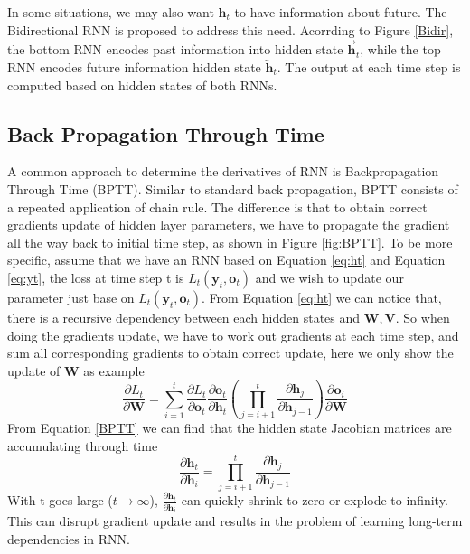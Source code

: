 	\noindent
	    In some situations, we may also want $\mathbf{h}_{t}$ to have information about future. 
	    The Bidirectional RNN\cite{schuster1997bidirectional} is proposed to address this need.
	    Acorrding to Figure \ref{Bidir}, the bottom RNN encodes past information into hidden state $\overrightarrow{\mathbf{h}}_{t}$, while the top RNN encodes future information hidden state $\overleftarrow{\mathbf{h}}_{t}$.
	The output at each time step is computed based on hidden states of both RNNs.  
\subsection{Back Propagation Through Time}
A common approach to determine the derivatives of RNN is Backpropagation Through Time (BPTT)\cite{werbos1990backpropagation}. 
Similar to standard back propagation, BPTT consists of a repeated application of chain rule. 
The difference is that to obtain correct gradients update of hidden layer parameters, we have to propagate the gradient all the way back to initial time step, as shown in Figure \ref{fig:BPTT}. 
	To be more specific, assume that we have an RNN based on Equation \ref{eq:ht} and Equation \ref{eq:yt}, the loss at time step t is $L_{t}(\mathbf{y}_{t},\mathbf{o}_{t})$ and we wish to update our parameter just base on $L_{t}(\mathbf{y}_{t},\mathbf{o}_{t})$.
	From Equation \ref{eq:ht} we can notice that, there is a recursive dependency between each hidden states and $\mathbf{W},\mathbf{V}$.
	So when doing the gradients update, we have to work out gradients at each time step, and sum all corresponding gradients to obtain correct update, here we only show the update of $\mathbf{W}$ as example
	\begin{equation}\label{BPTT}
	\frac{\partial L_{t}}{\partial \mathbf{W}} = \sum_{i=1}^{t}\frac{\partial L_{t}}{\partial\mathbf{o}_{t}}\frac{\partial \mathbf{o}_{t}}{\partial \mathbf{h}_{t}}(\prod_{j=i+1}^{t}\frac{\partial \mathbf{h}_{j}}{\partial \mathbf{h}_{j-1}})\frac{\partial \mathbf{o}_{i}}{\partial \mathbf{W}}
	\end{equation}
	From Equation \ref{BPTT} we can find that the hidden state Jacobian matrices are accumulating through time
	\[\frac{\partial \mathbf{h}_{t}}{\partial \mathbf{h}_{i}} = \prod_{j=i+1}^{t}\frac{\partial \mathbf{h}_{j}}{\partial \mathbf{h}_{j-1}}\]
	With t goes large ($t \rightarrow \infty$), $\frac{\partial \mathbf{h}_{t}}{\partial \mathbf{h}_{i}}$ can quickly shrink to zero or explode to infinity\cite{pascanu2013difficulty}. This can disrupt gradient update and results in the problem of learning long-term dependencies in RNN\cite{bengio1994learning}.
